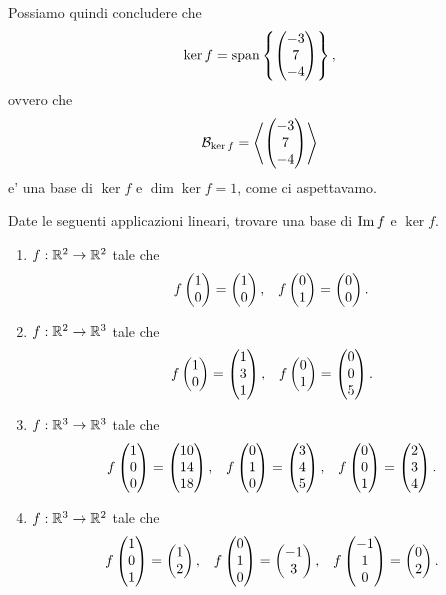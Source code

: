 \begin{example}
    Possiamo quindi concludere che \[
        \ker f = \operatorname{span}\left\{\begin{pmatrix} -3\\7\\-4 \end{pmatrix}\right\},
    \] ovvero che \[
        \mathcal{B}_{\ker f} = \left\langle \begin{pmatrix} -3\\7\\-4 \end{pmatrix} \right\rangle   
    \] e' una base di $\ker f$ e $\dim \ker f = 1$, come ci aspettavamo.
\end{example}

\begin{exercise}
    Date le seguenti applicazioni lineari, trovare una base di $\operatorname{Im}f$ e $\ker f$.

    \begin{enumerate}
        \item $f : \mathbb{R}^2 \to \mathbb{R}^2$ tale che \begin{align*}
            f\begin{pmatrix} 1\\0 \end{pmatrix} = \begin{pmatrix} 1\\0 \end{pmatrix}, &&f\begin{pmatrix} 0\\1 \end{pmatrix} = \begin{pmatrix} 0\\0 \end{pmatrix}.
        \end{align*}
        \item $f : \mathbb{R}^2 \to \mathbb{R}^3$ tale che \begin{align*}
            f\begin{pmatrix} 1\\0 \end{pmatrix} = \begin{pmatrix} 1\\3\\1 \end{pmatrix}, &&f\begin{pmatrix} 0\\1 \end{pmatrix} = \begin{pmatrix} 0\\0\\5 \end{pmatrix}.
        \end{align*}
        \item $f : \mathbb{R}^3 \to \mathbb{R}^3$ tale che \begin{align*}
            f\begin{pmatrix} 1\\0\\0 \end{pmatrix} = \begin{pmatrix} 10\\14\\18 \end{pmatrix}, &&f\begin{pmatrix} 0\\1\\0 \end{pmatrix} = \begin{pmatrix} 3\\4\\5 \end{pmatrix}, &&f\begin{pmatrix} 0\\0\\1 \end{pmatrix} = \begin{pmatrix} 2\\3\\4 \end{pmatrix}.
        \end{align*}
        \item $f : \mathbb{R}^3 \to \mathbb{R}^2$ tale che \begin{align*}
            f\mat{1\\0\\1} = \mat{1\\2}, &&f\mat{0\\1\\0} = \mat{-1\\3}, &&f\mat{-1\\1\\0} = \mat{0\\2}.

\end{align*}
\end{enumerate}
\end{exercise}
